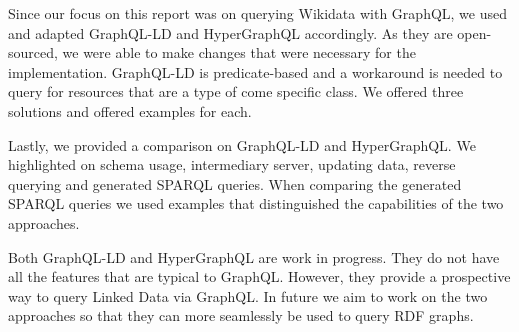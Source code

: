 Since our focus on this report was on querying Wikidata with GraphQL, we used and adapted GraphQL-LD and HyperGraphQL accordingly. As they are open-sourced, we were able to make changes that were necessary for the implementation. GraphQL-LD is predicate-based and a workaround is needed to query for resources that are a type of come specific class. We offered three solutions and offered examples for each. 

Lastly, we provided a comparison on GraphQL-LD and HyperGraphQL. We highlighted on schema usage, intermediary server, updating data, reverse querying and generated SPARQL queries. When comparing the generated SPARQL queries we used examples that distinguished the capabilities of the two approaches.

Both GraphQL-LD and HyperGraphQL are work in progress. They do not have all the features that are typical to GraphQL. However, they provide a prospective way to query Linked Data via GraphQL. In future we aim to work on the two approaches so that they can more seamlessly be used to query RDF graphs.